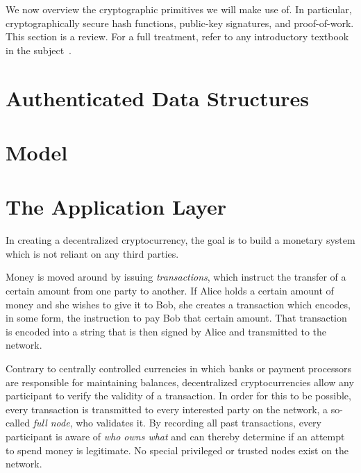 We now overview the cryptographic primitives we will make use of. In particular,
cryptographically secure hash functions, public-key signatures, and
proof-of-work. This section is a review. For a full
treatment, refer to any introductory textbook in the subject~\cite{katz,handbook,foundations1,foundations2}.





\section{Authenticated Data Structures}


\section{Model}




\section{The Application Layer}
In creating a decentralized cryptocurrency, the goal is to build a monetary
system which is not reliant on any third parties.

Money is moved around by issuing \emph{transactions}, which instruct the
transfer of a certain amount from one party to another. If Alice holds a
certain amount of money and she wishes to give it to Bob, she creates a
transaction which encodes, in some form, the instruction to pay Bob that certain
amount. That transaction is encoded into a string that is then signed by Alice
and transmitted to the network.

Contrary to centrally controlled currencies in which banks or payment processors
are responsible for maintaining balances, decentralized cryptocurrencies allow
any participant to verify the validity of a transaction. In order for this to be
possible, every transaction is transmitted to every interested party on the
network, a so-called \emph{full node}, who validates it. By recording all past
transactions, every participant is aware of \emph{who owns what} and can thereby
determine if an attempt to spend money is legitimate. No special privileged or
trusted nodes exist on the network.

